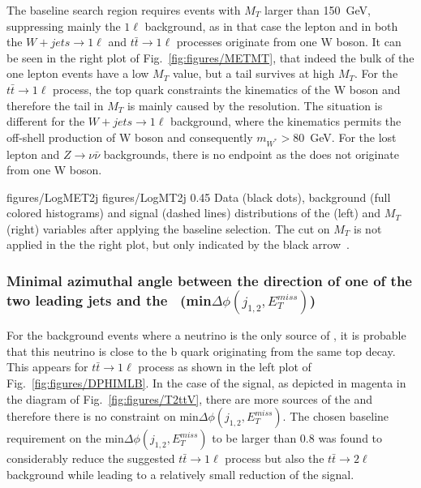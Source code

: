 The baseline search region requires events with $M_{T}$ larger than 150~GeV, suppressing mainly the $1 \ell$ background, as in that case the lepton and \MET in both the  $W+jets \to 1\ell$  and $t \bar{t} \to 1\ell$ processes originate from one W boson.  It can be seen in the right plot of Fig.~\ref{fig:figures/METMT}, that indeed the bulk of the one lepton events have a low $M_{T}$ value, but a tail survives at high $M_{T}$. For the $t \bar{t} \to 1\ell$ process, the top quark constraints the kinematics of the W boson and therefore the tail in $M_{T}$  is mainly caused by the \MET resolution. The situation is different for the $W+jets \to 1\ell$ background, where the kinematics permits the off-shell production of W boson and consequently $m_{W^{*}}> 80$~GeV. For the lost lepton and $Z \to \nu \bar{\nu}$ backgrounds, there is no endpoint as the \MET does not originate from one W boson.

                 {figures/LogMET2j} %
                 {figures/LogMT2j} %
                 {0.45}       %
                 { Data (black dots), background (full colored histograms) and signal (dashed lines) distributions of the \MET (left) and $M_{T}$ (right) variables after applying the baseline selection. The cut on $M_{T}$ is not applied in the the right plot, but only indicated by the black arrow~\cite{website:stopSupp}. }

\subsubsection{Minimal azimuthal angle between the direction of one of the two leading jets and the \MET~(min$\Delta \phi (j_{1,2}, E_{T}^{miss})$)}

For the background events where a neutrino is the only source of \MET, it is probable that this neutrino is close to the b quark  originating from the same top decay. This appears for $t\bar{t} \to 1\ell$ process as shown in the left plot of Fig.~\ref{fig:figures/DPHIMLB}. In the case of the signal, as depicted in magenta in the diagram of Fig.~\ref{fig:figures/T2ttV}, there are more sources of the \MET and therefore there is no constraint on min$\Delta \phi (j_{1,2}, E_{T}^{miss})$. The chosen baseline requirement on the min$\Delta \phi (j_{1,2}, E_{T}^{miss})$ to be larger than 0.8 was found to considerably reduce the suggested $t\bar{t} \to 1\ell$ process but also the $t\bar{t} \to 2\ell$  background while leading to a relatively small reduction of the signal.

